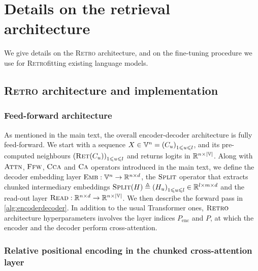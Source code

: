 \documentclass[11pt, a4paper, logo]{deepmind}
\newcommand{\ffw} {\textsc{Ffw}}
\newcommand{\attn}{\textsc{Attn}}
\newcommand{\ccca}{\textsc{Cca}}
\newcommand{\crossattention}{\textsc{Ca}}
\newcommand{\ret}{\textsc{Ret}}
\newcommand{\retro}{\textsc{Retro}\xspace}
\newcommand{\retrofitting}{\textsc{Retro}fitting\xspace}
\newcommand{\emb}{\textsc{Emb}}
\newcommand{\readout}{\textsc{Read}}
\newcommand{\spli}{\textsc{Split}}
\begin{document}
\section{Details on the retrieval architecture}

We give details on the \retro architecture, and on the fine-tuning procedure we use for \retrofitting existing language models.

\subsection{\retro architecture and implementation}

\subsubsection{Feed-forward architecture}\label{app:feed_forward}

As mentioned in the main text, the overall encoder-decoder architecture is fully feed-forward. 
We start with a sequence $X \in \mathbb{V}^n = {(C_u)}_{1 \leqslant u \leqslant l}$, and its pre-computed neighbours ${(\ret(C_u))}_{1 \leq u \leq l}$ and returns logits in $\mathbb{R}^{n \times | \mathbb{V} |}$. Along with $\attn$, $\ffw$, $\ccca$ and $\crossattention$ operators introduced in the main text, we define the decoder embedding layer $\emb: \VV^n \to \RR^{n \times d}$, the $\spli$ operator that extracts chunked intermediary embeddings $\spli(H) \triangleq {(H_u)}_{1 \leq u \leq l} \in \RR^{l \times m \times d}$ and the read-out layer $\readout: \RR^{n \times d} \to \RR^{n \times | \VV |}$. We then describe the forward pass in \autoref{alg:encoderdecoder}. In addition to the usual Transformer ones, $\retro$ architecture hyperparameters involves the layer indices $P_{\textrm{enc}}$ and $P$, at which the encoder and the decoder perform cross-attention.


\subsubsection{Relative positional encoding in the chunked cross-attention layer}\label{app:relative_pos}
\end{document}

